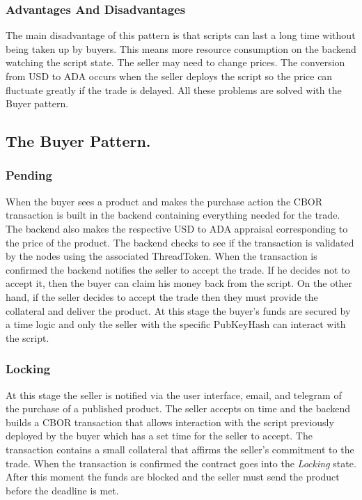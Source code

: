 \documentclass[12pt]{article}
\begin{document}
\subsubsection { Advantages And Disadvantages }

The main disadvantage of this pattern is that scripts can last a long time without being taken up by buyers.
This means more resource consumption on the backend watching the script state. The seller may need to change prices. The conversion from USD to ADA occurs when the seller deploys the script so the price can fluctuate greatly if the trade is delayed. All these problems are solved with the Buyer pattern.


\subsection { The Buyer Pattern. } 

\subsubsection { Pending }

When the buyer sees a product and makes the purchase action the CBOR transaction is built in the backend containing everything needed for the trade. The backend also makes the respective USD to ADA appraisal corresponding to the price of the product. The backend checks to see if the transaction is validated by the nodes using the associated ThreadToken. When the transaction is confirmed the backend notifies the seller to accept the trade. If he decides not to accept it, then the buyer can claim his money back from the script. On the other hand, if the seller decides to accept the trade then they must provide the collateral and deliver the product. At this stage the buyer's funds are secured by a time logic and only the seller with the specific PubKeyHash can interact with the script.

\subsubsection { Locking }

At this stage the seller is notified via the user interface, email, and telegram of the purchase of a published product. The seller accepts on time and the backend builds a CBOR transaction that allows interaction with the script previously deployed by the buyer which has a set time for the seller to accept. The transaction contains a small collateral that affirms the seller's commitment to the trade. When the transaction is confirmed the contract goes into the \emph{Locking} state. After this moment the funds are blocked and the seller must send the product before the deadline is met.
\end{document}
